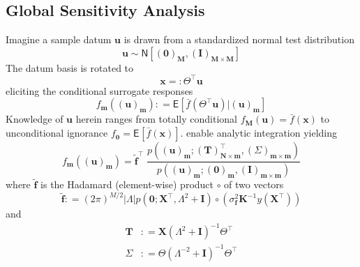 \documentclass[preprint,12pt]{elsarticle}
\newcommand*{\M}[1]{\ensuremath{#1}\xspace}
\newcommand*{\vr}[1]{\M{\mathbf{#1}}}
\newcommand*{\deq}{\M{\mathrel{\mathop:}=}}
\newcommand*{\deqr}{\M{=\mathrel{\mathop:}}}
\newcommand*{\ev}[2][]{\mathsf{E}_{#1}\!\left\lbrack{} #2 \right\rbrack}
\newcommand*{\gauss}[2]{\mathsf{N}\!\left\lbrack{} #1 , #2 \right\rbrack}
\newcommand*{\modulus}[1]{\M{\left\lvert#1\right\rvert}}
\begin{document}
        \subsection{Global Sensitivity Analysis} \label{sub:Method:GSA}
            Imagine a sample datum \(\vr{u}\) is drawn from a standardized normal test distribution
            \begin{equation} \label{eq:Method:GSA:uDist}
                \vr{u} \sim \gauss{(\vr{0})_{\vr{M}}}{(\vr{I})_{\vr{M}\times\vr{M}}}
            \end{equation}
            The datum basis is rotated to
            \begin{equation} \label{eq:Method:GSA:Rotation}
                \vr{x} \deqr \Theta^{\intercal} \vr{u}
            \end{equation}
            eliciting the conditional surrogate responses
            \begin{equation} \label{eq:Method:GSA:fmDef}
                f_{\vr{m}}((\vr{u})_{\vr{m}}) 
                    \deq \ev{\bar{f}(\Theta^{\intercal} \vr{u}) \vert (\vr{u})_{\vr{m}}}
            \end{equation}    
            Knowledge of $\vr{u}$ herein ranges from totally conditional $f_{\vr{M}}(\vr{u})=\bar{f}(\vr{x})$ to unconditional ignorance $f_{\vr{0}}=\ev{\bar{f}(\vr{x})}$.
             enable analytic integration yielding
            \begin{equation} \label{eq:Method:GSA:fmCalc}
                f_{\vr{m}}((\vr{u})_{\vr{m}}) = \tilde{\vr{f}}^{\intercal} \; 
				\frac 
					{p\!\left((\vr{u})_{\vr{m}} ; (\vr{T})_{\vr{N}\times\vr{m}}^{\intercal}, (\Sigma)_{\vr{m}\times\vr{m}}\right)}
					{p\!\left((\vr{u})_{\vr{m}} ; (\vr{0})_{\vr{m}},(\vr{I})_{\vr{m}\times\vr{m}}\right)}
            \end{equation}
            where $\tilde{\vr{f}}$ is the Hadamard (element-wise) product $\circ$ of two vectors
            \begin{equation} \label{eq:Method:GSA:gDef}
                \tilde{\vr{f}} \deq
                (2 \pi)^{M/2} \modulus{\Lambda} p\!\left(\vr{0};\vr{X}^{\intercal} , \Lambda^{2} + \vr{I}\right)
                \circ\left(\sigma^{2}_\vr{f} \vr{K}^{-1} y(\vr{X}^{\intercal})\right) 
            \end{equation}
            and
            \begin{align} \label{eq:Method:GSA:TSigmaDef}
                \vr{T} &\deq 
                    \vr{X} \left(\Lambda^{2} + \vr{I}\right)^{-1} \Theta^{\intercal} \\
                \Sigma &\deq 
                    \Theta \left(\Lambda^{-2} + \vr{I}\right)^{-1} \Theta^{\intercal}
            \end{align}
\end{document}
